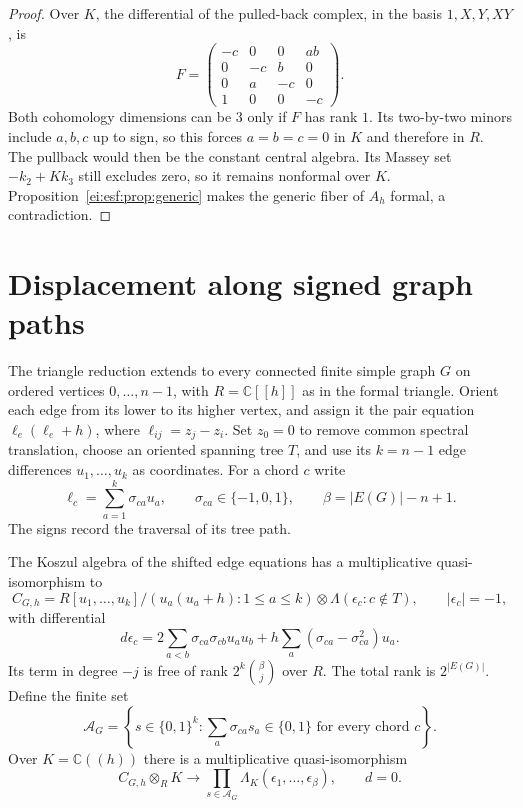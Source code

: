 \begin{proof}
Over $K$, the differential of the pulled-back complex,
in the basis $1,X,Y,XY$, is
\[
 F=\begin{pmatrix}
 -c&0&0&ab\\0&-c&b&0\\0&a&-c&0\\1&0&0&-c
 \end{pmatrix}.
\]
Both cohomology dimensions can be $3$ only if $F$ has
rank $1$. Its two-by-two minors include $a,b,c$ up to
sign, so this forces $a=b=c=0$ in $K$ and therefore in $R$.
The pullback would then be the constant central algebra.
Its Massey set $-k_2+Kk_3$ still excludes zero, so it
remains nonformal over $K$. Proposition~\ref{ei:esf:prop:generic}
makes the generic fiber of $A_h$ formal, a contradiction.
\end{proof}


\section{Displacement along signed graph paths}
\label{ei:sec:shifted-graphs}

The triangle reduction extends to every connected finite
simple graph $G$ on ordered vertices $0,\ldots,n-1$,
with $R=\mathbb C[[h]]$ as in the formal triangle.
Orient each edge from its lower to its higher vertex,
and assign it the pair equation $\ell_e(\ell_e+h)$,
where $\ell_{ij}=z_j-z_i$. Set $z_0=0$ to remove common
spectral translation, choose an oriented spanning tree
$T$, and use its $k=n-1$ edge differences $u_1,\ldots,u_k$
as coordinates. For a chord $c$ write
\[
 \ell_c=\sum_{a=1}^k\sigma_{ca}u_a,\qquad
 \sigma_{ca}\in\{-1,0,1\},\qquad
 \beta=|E(G)|-n+1.
\]
The signs record the traversal of its tree path.

\begin{theorem}\label{ei:esf:thm:graphs}
The Koszul algebra of the shifted edge equations has a
multiplicative quasi-isomorphism to
\begin{equation}\label{ei:esf:eq:graph-model}
 C_{G,h}=
 R[u_1,\ldots,u_k]/(u_a(u_a+h):1\le a\le k)
       \otimes\Lambda(\epsilon_c:c\notin T),
 \qquad |\epsilon_c|=-1,
\end{equation}
with differential
\begin{equation}\label{ei:esf:eq:chord}
 d\epsilon_c=
 2\sum_{a<b}\sigma_{ca}\sigma_{cb}u_au_b
 +h\sum_a(\sigma_{ca}-\sigma_{ca}^2)u_a.
\end{equation}
Its term in degree $-j$ is free of rank
$2^k\binom\beta j$ over $R$. The total rank is $2^{|E(G)|}$.
Define the finite set
\[
 \mathcal A_G=
 \left\{s\in\{0,1\}^k:
       \sum_a\sigma_{ca}s_a\in\{0,1\}
       \text{ for every chord }c\right\}.
\]
Over $K=\mathbb C((h))$ there is a multiplicative
quasi-isomorphism
\begin{equation}\label{ei:esf:eq:graph-generic}
 C_{G,h}\otimes_R K\longrightarrow
 \prod_{s\in\mathcal A_G}
       \Lambda_K(\epsilon_1,\ldots,\epsilon_\beta),
 \qquad d=0.
\end{equation}
\end{theorem}

